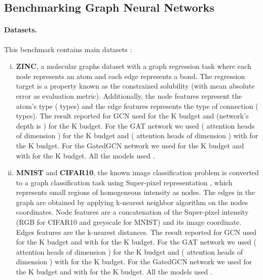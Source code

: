 \documentclass{article} \usepackage{iclr2021_conference,times}
\begin{document}
\subsection{Benchmarking Graph Neural Networks \citep{dwivedi2020benchmarking}} \label{app:dwivedi}

\paragraph{Datasets.} 
This benchmark contains  main datasets :
\begin{enumerate}[(i)]
\item \textbf{ZINC}, a molecular graphs dataset with a graph regression task where each node represents an atom and each edge represents a bond. The regression target is a property known as the constrained solubility (with mean absolute error as evaluation metric). Additionally, the node features represent the atom's type ( types) and the edge features represents the type of connection ( types).
The result reported for GCN used  for the K budget and  (network's depth is ) for the K budget. For the GAT network we used  ( attention heads of dimension ) for the K budget and  ( attention heads of dimension ) with  for the K budget. For the GatedGCN network we used  for the K budget and  with  for the K budget. All the models used .

\item  \textbf{MNIST} and \textbf{CIFAR10}, the known image classification problem is converted to a graph classification task using Super-pixel representation \citep{Knyazev_superpixel}, which represents small regions of homogeneous intensity as nodes. The edges in the graph are obtained by applying k-nearest neighbor algorithm on the nodes coordinates. Node features are a concatenation of the Super-pixel intensity (RGB for CIFAR10 and greyscale for MNIST) and its image coordinate. Edges features are the k-nearest distances.
The result reported for GCN used  for the K budget and  with  for the K budget. For the GAT network we used  ( attention heads of dimension ) for the K budget and  ( attention heads of dimension ) with  for the K budget. For the GatedGCN network we used  for the K budget and  with  for the K budget. All the models used .


\end{enumerate}
\end{document}
